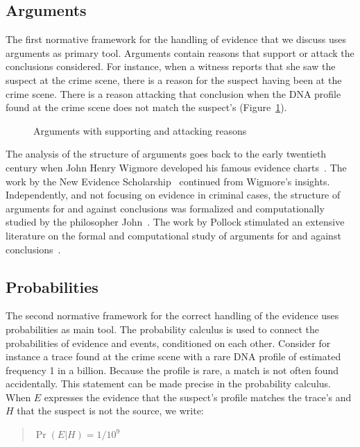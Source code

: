 \documentclass[10pt]{article}
\begin{document}
\subsection{Arguments}

The first normative framework for the handling of evidence that we discuss uses arguments as primary tool. Arguments contain reasons that support or attack the conclusions considered. For instance, when a witness reports that she saw the suspect at the crime scene, there is a reason for the suspect having been at the crime scene. There is a reason attacking that conclusion when the DNA profile found at the crime scene does not match the suspect's (Figure~\ref{fig:arg}). 

\begin{figure}[bt]
\centering

\caption{Arguments with supporting and attacking reasons\label{fig:arg}}
\end{figure}

The analysis of the structure of arguments goes back to the early twentieth century when John Henry Wigmore developed his famous evidence charts~\citep{wigmore1913,wigmore1931}. The work by the New Evidence Scholarship~\citep{andersonEtal2005} continued from Wigmore's insights. Independently, and not focusing on evidence in criminal cases, the structure of arguments for and against conclusions was formalized and computationally studied by the philosopher John~\citet{pollock1987,pollock1995}. The work by Pollock stimulated an extensive literature on the formal and computational study of arguments for and against conclusions~\citep{vanEemerenEtal2014Ch11}.

\subsection{Probabilities}
The second normative framework for the correct handling of the evidence uses probabilities as main tool. The probability calculus is used to connect the probabilities of evidence and events, conditioned on each other. Consider for instance a trace found at the crime scene with a rare DNA profile of estimated frequency 1 in a billion. Because the profile is rare, a match is not often found accidentally. This statement can be made precise in the probability calculus. When $E$ expresses the evidence that the suspect's profile matches the trace's and $H$ that the suspect is not the source, we write:

\begin{quotation}
	$\Pr(E|H) = 1/10^9$
\end{quotation}
\end{document}
